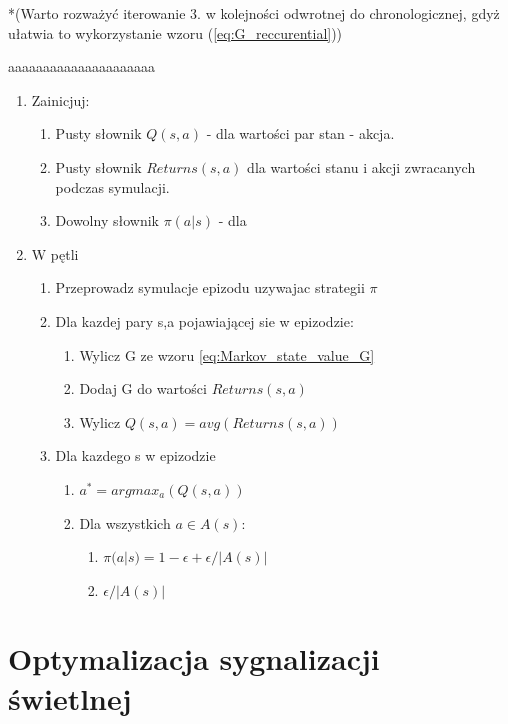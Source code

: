 \documentclass[12pt]{book}
\theoremstyle{plain}
\begin{document}
*(Warto rozważyć iterowanie 3. w kolejności odwrotnej do chronologicznej, gdyż ułatwia to wykorzystanie wzoru (\ref{eq:G_reccurential}))

aaaaaaaaaaaaaaaaaaaaa
\begin{enumerate}
	\item Zainicjuj:
	\begin{enumerate}
		\item Pusty słownik $Q(s,a)$ - dla wartości par stan - akcja.
		\item Pusty słownik $Returns(s,a)$ dla wartości stanu i akcji zwracanych podczas symulacji.
		\item Dowolny słownik $\pi(a|s)$ - dla 
	\end{enumerate}
\item W pętli
\begin{enumerate}
	\item Przeprowadz symulacje epizodu uzywajac strategii $\pi$
	\item Dla kazdej pary s,a pojawiającej sie w epizodzie:
	\begin{enumerate}
		\item Wylicz G ze wzoru \ref{eq:Markov_state_value_G}
		\item Dodaj G do wartości $Returns(s,a)$
		\item Wylicz $Q(s,a)=avg(Returns(s,a))$
	\end{enumerate}
	\item Dla kazdego s w epizodzie
	\begin{enumerate}
		\item $a^*=argmax_a(Q(s,a))$
		\item Dla wszystkich $a\in A(s)$:
		\begin{enumerate}
			\item $\pi(a|s)=1-\epsilon+\epsilon/|A(s)|$
			\item $\epsilon/|A(s)|$
		\end{enumerate}
	\end{enumerate}
\end{enumerate}
\end{enumerate}


\chapter{Optymalizacja sygnalizacji świetlnej}

\end{document}
